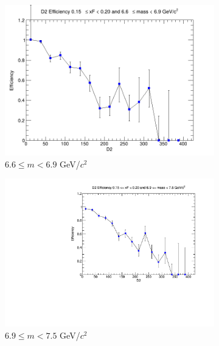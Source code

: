 \begin{figure}[p]
\begin{subfigure}[b]{0.32\textwidth}
        \includegraphics[width=\textwidth]{./kTrackerEfficiencyPlots/D2_Efficiency_xF3_mass8.png}
        \caption{$6.6 \leq m < 6.9$ GeV/$c^2$}
        \label{fig:xF3_mass8}
    \end{subfigure}
    \vspace{0.5cm}
    \begin{subfigure}[b]{0.32\textwidth}
        \centering
        \includegraphics[width=\textwidth]{./kTrackerEfficiencyPlots/D2_Efficiency_xF3_mass9.pdf}
        \caption{$6.9 \leq m < 7.5$ GeV/$c^2$}
        \label{fig:xF3_mass9}
    \end{subfigure}
    \hfill
    \begin{subfigure}[b]{0.32\textwidth}
        \centering

\end{subfigure}
\end{figure}
